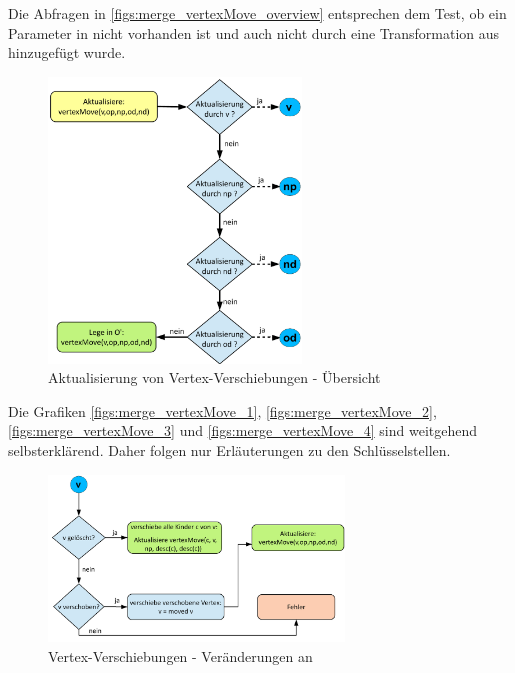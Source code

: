 Die Abfragen  in \autoref{figs:merge_vertexMove_overview} entsprechen dem Test, ob ein Parameter  in  nicht vorhanden ist und auch nicht durch eine Transformation aus \code{$\Delta$} hinzugefügt wurde.

\begin{figure}
\begin{center}
\includegraphics[width=0.6\textwidth]{figs/merge_vertexMove_overview.pdf}
\end{center}
\caption{Aktualisierung von Vertex-Verschiebungen - Übersicht}
\label{figs:merge_vertexMove_overview}
\end{figure}

Die Grafiken \autoref{figs:merge_vertexMove_1}, \autoref{figs:merge_vertexMove_2}, \autoref{figs:merge_vertexMove_3} und \autoref{figs:merge_vertexMove_4} sind weitgehend selbsterklärend. Daher folgen nur Erläuterungen zu den Schlüsselstellen. \par

\begin{figure}
\begin{center}
\includegraphics[width=0.7\textwidth]{figs/merge_vertexMove_1.pdf}
\end{center}
\caption{Vertex-Verschiebungen - Veränderungen an }
\label{figs:merge_vertexMove_1}
\end{figure}

